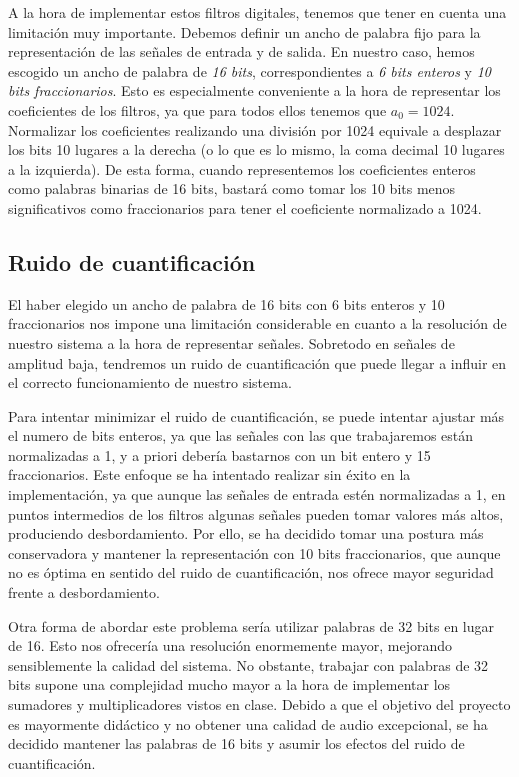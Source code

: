 \documentclass[a4paper,12pt]{article}
\begin{document}
A la hora de implementar estos filtros digitales, tenemos que tener en cuenta una limitación muy importante. Debemos definir un ancho de palabra fijo para la representación de las señales de entrada y de salida. En nuestro caso, hemos escogido un ancho de palabra de \emph{16 bits}, correspondientes a \emph{6 bits enteros} y \emph{10 bits fraccionarios}. Esto es especialmente conveniente a la hora de representar los coeficientes de los filtros, ya que para todos ellos tenemos que $a_0 = 1024$. Normalizar los coeficientes realizando una división por 1024 equivale a desplazar los bits 10 lugares a la derecha (o lo que es lo mismo, la coma decimal 10 lugares a la izquierda). De esta forma, cuando representemos los coeficientes enteros como palabras binarias de 16 bits, bastará como tomar los 10 bits menos significativos como fraccionarios para tener el coeficiente normalizado a 1024.

\subsection{Ruido de cuantificación}
El haber elegido un ancho de palabra de 16 bits con 6 bits enteros y 10 fraccionarios nos impone una limitación considerable en cuanto a la resolución de nuestro sistema a la hora de representar señales. Sobretodo en señales de amplitud baja, tendremos un ruido de cuantificación que puede llegar a influir en el correcto funcionamiento de nuestro sistema.

Para intentar minimizar el ruido de cuantificación, se puede intentar ajustar más el numero de bits enteros, ya que las señales con las que trabajaremos están normalizadas a 1, y a priori debería bastarnos con un bit entero y 15 fraccionarios. Este enfoque se ha intentado realizar sin éxito en la implementación, ya que aunque las señales de entrada estén normalizadas a 1, en puntos intermedios de los filtros algunas señales pueden tomar valores más altos, produciendo desbordamiento. Por ello, se ha decidido tomar una postura más conservadora y mantener la representación con 10 bits fraccionarios, que aunque no es óptima en sentido del ruido de cuantificación, nos ofrece mayor seguridad frente a desbordamiento.

Otra forma de abordar este problema sería utilizar palabras de 32 bits en lugar de 16. Esto nos ofrecería una resolución enormemente mayor, mejorando sensiblemente la calidad del sistema. No obstante, trabajar con palabras de 32 bits supone una complejidad mucho mayor a la hora de implementar los sumadores y multiplicadores vistos en clase. Debido a que el objetivo del proyecto es mayormente didáctico y no obtener una calidad de audio excepcional, se ha decidido mantener las palabras de 16 bits y asumir los efectos del ruido de cuantificación.
\end{document}
